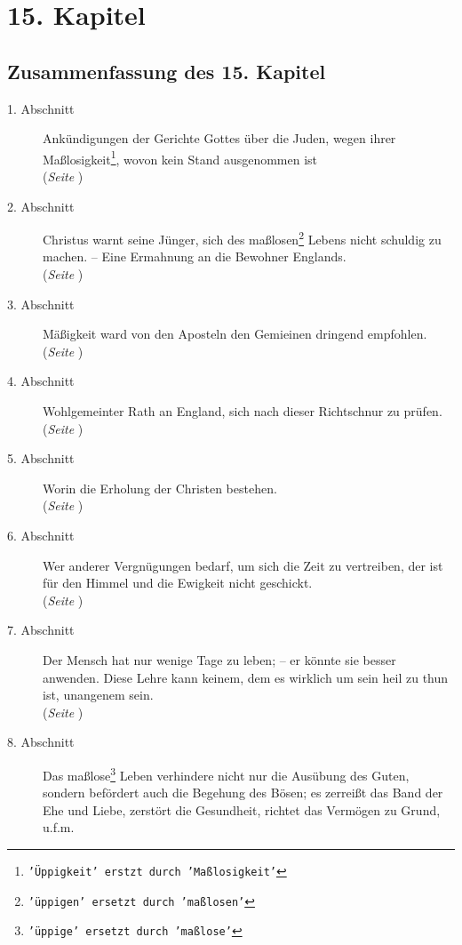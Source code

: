
\chapter{15. Kapitel} \label{kap15}

\section{Zusammenfassung des 15. Kapitel}

\begin{description}
\item[1. Abschnitt] Ankündigungen der Gerichte Gottes über die Juden, wegen
ihrer Maßlosigkeit\footnote{\texttt{'Üppigkeit' erstzt durch 'Maßlosigkeit'}}, wovon
kein Stand ausgenommen ist
\\(\textit{Seite \pageref{kap15_ab1}})
\item[2. Abschnitt] Christus warnt seine Jünger, sich des
maßlosen\footnote{\texttt{'üppigen' ersetzt durch 'maßlosen'}} Lebens nicht
schuldig zu machen. -- Eine Ermahnung an die Bewohner Englands.
\\(\textit{Seite \pageref{kap15_ab2}})
\item[3. Abschnitt] Mäßigkeit ward von den Aposteln den Gemieinen dringend
empfohlen.
\\(\textit{Seite \pageref{kap15_ab3}})
\item[4. Abschnitt] Wohlgemeinter Rath an England, sich nach dieser Richtschnur
zu prüfen.
\\(\textit{Seite \pageref{kap15_ab4}})
\item[5. Abschnitt] Worin die Erholung der Christen bestehen.
\\(\textit{Seite \pageref{kap15_ab5}})
\item[6. Abschnitt] Wer anderer Vergnügungen bedarf, um sich die Zeit zu
vertreiben, der ist für den Himmel und die Ewigkeit nicht geschickt.
\\(\textit{Seite \pageref{kap15_ab6}})
\item[7. Abschnitt] Der Mensch hat nur wenige Tage zu leben; -- er könnte sie
besser anwenden. Diese Lehre kann keinem, dem es wirklich um sein heil zu thun
ist, unangenem sein.
\\(\textit{Seite \pageref{kap15_ab6}})
\item[8. Abschnitt] Das maßlose\footnote{\texttt{'üppige' ersetzt durch 'maßlose'}}
Leben verhindere nicht nur die Ausübung des
Guten, sondern befördert auch die Begehung des Bösen; es zerreißt das Band der
Ehe und Liebe, zerstört die Gesundheit, richtet das Vermögen zu Grund, u.f.m.

\end{description}
